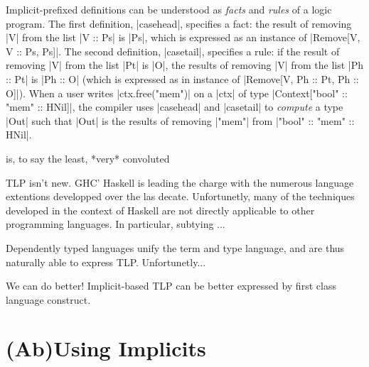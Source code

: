 \memImplicitRemoveCodeSection



Implicit-prefixed definitions can be understood as \emph{facts} and \emph{rules} of a logic program.
The first definition, |casehead|, specifies a fact: the result of removing |V| from the list |V :: Ps| is |Ps|, which is expressed as an instance of |Remove[V, V :: Ps, Ps]|.
The second definition, |casetail|, specifies a rule: if the result of removing |V| from the list |Pt| is |O|, the results of removing |V| from the list |Ph :: Pt| is |Ph :: O| (which is expressed as in instance of |Remove[V, Ph :: Pt, Ph :: O]|).
When a user writes |ctx.free("mem")| on a |ctx| of type |Context["bool" :: "mem" :: HNil]|, the compiler uses |casehead| and |casetail| to \emph{compute} a type |Out| such that |Out| is the results of removing |"mem"| from |"bool" :: "mem" :: HNil|.

is, to say the least, *very* convoluted

TLP isn't new. GHC' Haskell is leading the charge with the numerous language extentions developped over the las decate. Unfortunetly, many of the techniques developed in the context of Haskell are not directly applicable to other programming languages. In particular, subtying ...

Dependently typed languages unify the term and type language, and are thus naturally able to express TLP. Unfortunetly...

We can do better! Implicit-based TLP can be better expressed by first class language construct.




\lipsum[1]

\chapter{(Ab)Using Implicits}
\label{chap:ab-using-implicits}
\lipsum[1]


